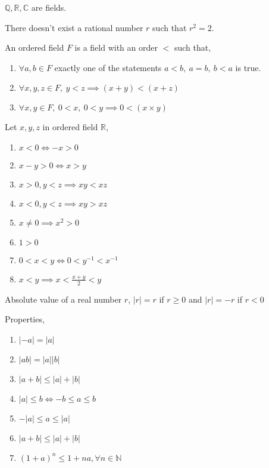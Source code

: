 	\begin{remark}
		$\mathbb{Q},\mathbb{R},\mathbb{C}$ are fields.
	\end{remark}
	\begin{theorem}
		There doesn't exist a rational number $r$ such that $r^2 = 2$.
	\end{theorem}
	\begin{axiom}[Order]
		An ordered field $F$ is a field with an order $<$ such that,
		\begin{enumerate}
			\item $\forall a,b \in F$ exactly one of the statements $a<b,\ a=b,\ b<a$ is true.
			\item $\forall x,y,z \in F,\ y<z \implies (x+y)<(x+z)$
			\item $\forall x,y \in F,\ 0 < x,\ 0 < y \implies 0 < (x \times y)$
		\end{enumerate}
	\end{axiom}
	\begin{remark} Let $x,y,z$ in ordered field $\mathbb{R}$,
		\begin{enumerate}
			\item $x < 0 \iff -x > 0$
			\item $x - y > 0 \iff x > y$
			\item $x > 0, y < z \implies xy < xz$
			\item $x < 0, y < z \implies xy > xz$
			\item $x \ne 0 \implies x^2 > 0$
			\item $1 > 0$
			\item $0 < x < y \iff 0 < y^{-1} < x^{-1}$
			\item $x < y \implies x < \frac{x+y}{2} < y$
		\end{enumerate}
	\end{remark}
	\begin{definition}
		Absolute value of a real number $r$, $|r| = r$ if $r \ge 0$ and $|r| = -r$ if $r < 0$
	\end{definition}
	\begin{remark}Properties,
		\begin{enumerate}
			\item $|-a| = |a|$
			\item $|ab| = |a||b|$
			\item $|a+b| \le |a|+|b|$
			\item $|a| \le b \iff -b \le a \le b$
			\item $-|a| \le a \le |a|$
			\item $|a+b| \le |a| + |b|$
			\item $(1+a)^n \le 1+na, \forall n \in \mathbb{N}$
		\end{enumerate}
	\end{remark}

